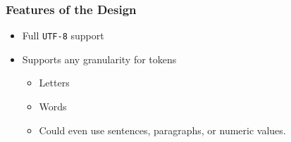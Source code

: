 \documentclass{beamer}
\begin{document}
\begin{frame}
   \frametitle{Features of the Design}
   \begin{itemize}
      \item Full \texttt{UTF-8} support
      \item Supports any granularity for tokens
      \begin{itemize}
         \item Letters
         \item Words
         \item Could even use sentences, paragraphs, or numeric values.
      \end{itemize}
   \end{itemize}
\end{frame}
\end{document}
